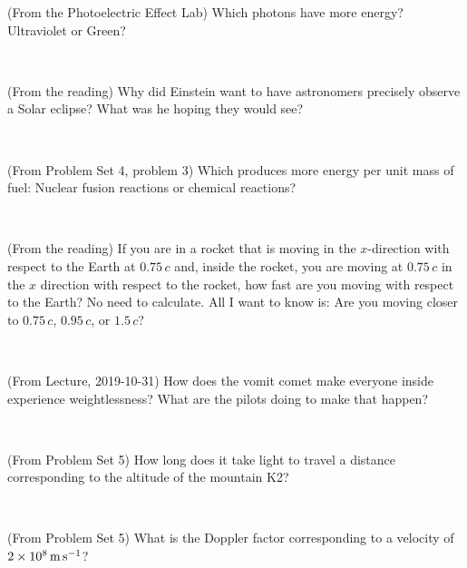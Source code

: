 \documentclass[12pt, letterpaper]{article}
\begin{document}
\clearpage

\begin{problem}
(From the Photoelectric Effect Lab)
Which photons have more energy? Ultraviolet or Green?
\end{problem}

\vfill ~

\begin{problem}
(From the reading)
Why did Einstein want to have astronomers precisely observe a Solar eclipse?
What was he hoping they would see?
\end{problem}

\vfill ~

\begin{problem}
(From Problem Set 4, problem 3)
Which produces more energy per unit mass of fuel: Nuclear fusion reactions or chemical reactions?
\end{problem}

\vfill ~

\begin{problem}
(From the reading)
If you are in a rocket that is moving in the $x$-direction with
respect to the Earth at $0.75\,c$ and, inside the rocket, you are
moving at $0.75\,c$ in the $x$ direction with respect to the rocket,
how fast are you moving with respect to the Earth? No need to
calculate. All I want to know is: Are you moving closer to $0.75\,c$,
$0.95\,c$, or $1.5\,c$?
\end{problem}

\vfill ~

\cleardoublepage

\begin{problem}
(From Lecture, 2019-10-31)
How does the vomit comet make everyone inside experience weightlessness?
What are the pilots doing to make that happen?
\end{problem}

\vfill ~

\begin{problem}
(From Problem Set 5)
How long does it take light to travel a distance corresponding to the altitude of the mountain K2?
\end{problem}

\vfill ~

\begin{problem}
(From Problem Set 5)
What is the Doppler factor corresponding to a velocity of $2\times 10^8\,\mathrm{m}\,\mathrm{s}^{-1}$?
\end{problem}

\vfill ~
\end{document}
